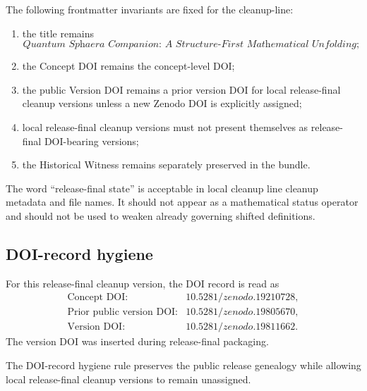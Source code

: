 \begin{definition}
\label{def:v407-frontmatter-invariants}
The following frontmatter invariants are fixed for the cleanup-line:
\begin{enumerate}[leftmargin=*]
 \item the title remains
 \[
 \textit{Quantum Sphaera Companion: A Structure-First Mathematical Unfolding};
 \]
 \item the Concept DOI remains the concept-level DOI;
 \item the public  Version DOI remains a prior version DOI for local
 release-final cleanup versions unless a new Zenodo DOI is explicitly assigned;
 \item local release-final cleanup versions must not present themselves as release-final
 DOI-bearing versions;
 \item the Historical Witness remains separately preserved in the bundle.
\end{enumerate}
\end{definition}

\begin{remark}
\label{rem:v407-release-final state-wording}
The word ``release-final state'' is acceptable in local cleanup line cleanup metadata and file
names. It should not appear as a mathematical status operator and should not
be used to weaken already governing shifted definitions.
\end{remark}

\subsection{DOI-record hygiene}
\label{subsec:v407-doi-record-hygiene}

\begin{definition}
\label{def:v407-doi-record-hygiene-rule}
For this release-final cleanup version, the DOI record is read as
\[
\begin{array}{ll}
\text{Concept DOI:} & 10.5281/zenodo.19210728,\\
\text{Prior public version DOI:} & 10.5281/zenodo.19805670,\\
\text{Version DOI:} & 10.5281/zenodo.19811662.
\end{array}
\]
The version DOI was inserted during release-final packaging.
\end{definition}

\begin{lemma}
\label{lem:v407-doi-hygiene-preserves-release-genealogy}
The DOI-record hygiene rule preserves the public  release genealogy while
allowing local release-final cleanup versions to remain unassigned.
\end{lemma}

